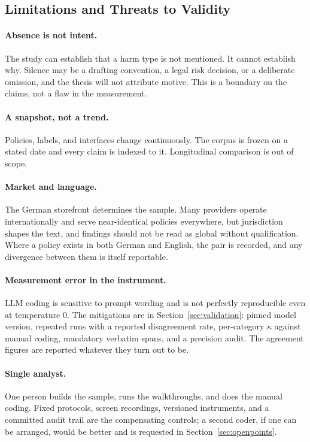 \subsection{Limitations and Threats to Validity}

\paragraph{Absence is not intent.}
The study can establish that a harm type is not mentioned. It cannot establish
why. Silence may be a drafting convention, a legal risk decision, or a
deliberate omission, and the thesis will not attribute motive. This is a
boundary on the claims, not a flaw in the measurement.

\paragraph{A snapshot, not a trend.}
Policies, labels, and interfaces change continuously. The corpus is frozen on a
stated date and every claim is indexed to it. Longitudinal comparison is out of
scope.

\paragraph{Market and language.}
The German storefront determines the sample. Many providers operate
internationally and serve near-identical policies everywhere, but jurisdiction
shapes the text, and findings should not be read as global without
qualification. Where a policy exists in both German and English, the pair is
recorded, and any divergence between them is itself reportable.

\paragraph{Measurement error in the instrument.}
LLM coding is sensitive to prompt wording and is not perfectly reproducible even
at temperature 0. The mitigations are in Section~\ref{sec:validation}: pinned
model version, repeated runs with a reported disagreement rate, per-category
$\kappa$ against manual coding, mandatory verbatim spans, and a precision audit.
The agreement figures are reported whatever they turn out to be.

\paragraph{Single analyst.}
One person builds the sample, runs the walkthroughs, and does the manual coding.
Fixed protocols, screen recordings, versioned instruments, and a committed audit
trail are the compensating controls; a second coder, if one can be arranged,
would be better and is requested in Section~\ref{sec:openpoints}.

